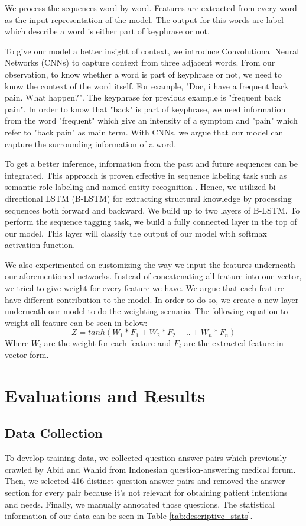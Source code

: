 We process the sequences word by word. Features are extracted from every word as the input representation of the model. The output for this words are label which describe a word is either part of keyphrase or not.

To give our model a better insight of context, we introduce Convolutional Neural Networks (CNNs) to capture context from three adjacent words.  From our observation, to know whether a word is part of keyphrase or not, we need to know the context of the word itself. For example, "Doc, i have a frequent back pain. What happen?". The keyphrase for previous example is "frequent back pain". In order to know that "back" is part of keyphrase, we need information from the word "frequent" which give an intensity of a symptom and "pain" which refer to "back pain" as main term. With CNNs, we argue that our model can capture the surrounding information of a word.

To get a better inference, information from the past and future sequences can be integrated. This approach is proven effective  in sequence labeling task such as semantic role labeling \cite{SMRzhou2015end} and named entity recognition \cite{ma2016end}. Hence, we utilized  bi-directional LSTM (B-LSTM) for extracting structural knowledge by processing sequences both forward and backward. We build up to two layers of B-LSTM.
To perform the sequence tagging task, we build a fully connected layer in the top of our model. This layer will classify the output of our model with softmax activation function.

We also experimented on customizing the way we input the features underneath our aforementioned networks. Instead of concatenating all feature into one vector, we tried to give weight for every feature we have. We argue that each feature have different contribution to the model. In order to do so, we create a new layer underneath our model to do the weighting scenario. The following equation to weight all feature can be seen in below:
\begin{equation}
Z =  tanh(W _{1}*F_{1} + W_{2}*F_{2} + .. + W_{n}*F_{n})
\end{equation}
Where $W_{i}$ are the weight for each feature and $F_{i}$ are the extracted feature in vector form.


\section{Evaluations and Results}
\subsection{Data Collection}
To develop training data, we collected question-answer pairs which previously crawled by Abid \cite{skripsiKakAbid} and Wahid \cite{skripsiWahid} from Indonesian question-answering medical forum. Then, we selected 416 distinct question-answer pairs and removed the answer section for every pair because it's not relevant for obtaining patient intentions and needs. Finally, we manually annotated those questions. The statistical information of our data can be seen in Table \ref{tab:descriptive_stats}.

